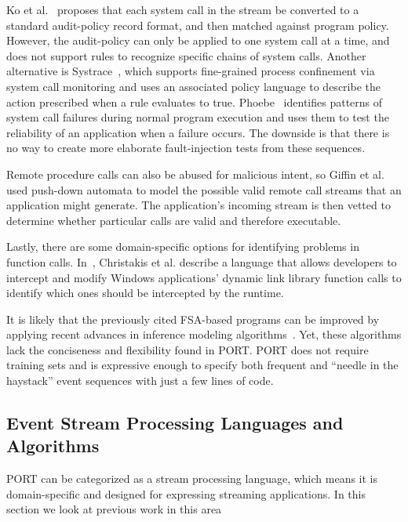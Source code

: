 Ko et al.~\cite{DBLP:conf/acsac/KoFL94} 
proposes that each system call in the
stream be converted to a standard audit-policy record format, and then
matched against program policy.
However, the audit-policy can only be applied to
one system call at a time,
and does not support rules to recognize specific chains of system calls.
Another alternative is
Systrace~\cite{DBLP:conf/uss/Provos03},
which
supports fine-grained process confinement
via system call monitoring and uses an associated policy language 
to describe the action prescribed when a rule evaluates to true.
Phoebe~\cite{DBLP:journals/corr/abs-2006-04444}
identifies patterns of system call failures during normal program execution
and uses them
to test the reliability of an application when a failure occurs.
The downside is that there is no way to create more elaborate fault-injection
tests from these sequences.

Remote procedure calls can also be abused for malicious
intent,
so Giffin et al. ~\cite{DBLP:conf/uss/GiffinJM02} used
push-down automata to model the possible valid
remote call streams that an application might generate.
The application's incoming stream 
is then vetted
to determine whether particular calls are valid and therefore executable.

Lastly, there are some domain-specific options for
identifying problems
in function calls.
In~\cite{DBLP:conf/icse/ChristakisEG017}, Christakis et al. describe a language that allows developers to intercept and modify
Windows applications’ dynamic link library function calls to identify which ones should be
intercepted by the runtime.

%
It is likely that the previously cited FSA-based programs can be improved by applying recent advances in inference modeling algorithms~\cite{MarianiPS17,WalkinshawTD13,EmamM18,BeschastnikhBEK14}. Yet, these algorithms lack the conciseness and flexibility found in PORT. PORT does not require training sets and is expressive enough to specify both frequent and  “needle in the haystack” event sequences with just a few lines of code.


\subsection{Event Stream Processing Languages and Algorithms}
PORT can be categorized as a stream processing language,
which means it is domain-specific and
designed for expressing streaming applications.
In this section we look at previous work in this area

